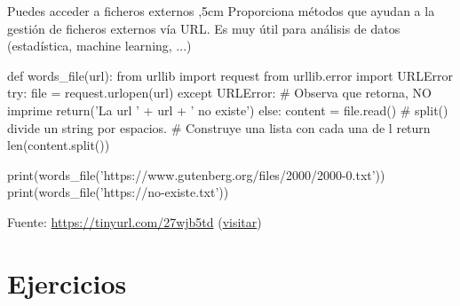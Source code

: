 \documentclass[10pt, envcountsect , spanish]{beamer}
\begin{document}
\begin{frame}[fragile]{Puedes acceder a ficheros externos} 
,5cm Proporciona métodos que ayudan a la gestión de ficheros externos vía URL.
Es muy útil para análisis de datos (estadística, machine learning, ...)
\footnotesize
\begin{pyconsole}[][frame=single]%

def words_file(url):
    from urllib import request
    from urllib.error import URLError
    try:
        file = request.urlopen(url)
    except URLError:
        # Observa que retorna, NO imprime
        return('La url ' + url + ' no existe')  
    else:
        content = file.read()
        # split() divide un string por espacios.
        # Construye una lista con cada una de l
        return len(content.split())

print(words_file('https://www.gutenberg.org/files/2000/2000-0.txt'))
print(words_file('https://no-existe.txt'))
\end{pyconsole}
\small 

Fuente: \url{https://tinyurl.com/27wjb5td}
(\href{https://colab.research.google.com/github/asalber/aprendeconalf/blob/master/content/es/docencia/python/ejercicios/soluciones/ficheros/ejercicio4.ipynb#scrollTo=jI7IVazxvG0U}{visitar})
\end{frame}




\section{Ejercicios}
\end{document}
